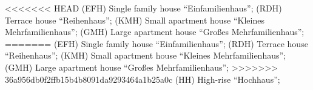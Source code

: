 <<<<<<< HEAD
(EFH) Single family house ``Einfamilienhaus'';
(RDH) Terrace house ``Reihenhaus'';
(KMH) Small apartment house ``Kleines Mehrfamilienhaus'';
(GMH) Large apartment house ``Großes Mehrfamilienhaus'';
=======
(EFH) Single family house ``Einfamilienhaus'';
(RDH) Terrace house ``Reihenhaus'';
(KMH) Small apartment house ``Kleines Mehrfamilienhaus'';
(GMH) Large apartment house ``Großes Mehrfamilienhaus'';
>>>>>>> 36a956db0f2ffb15b4b8091da9293464a1b25a0c
(HH) High-rise ``Hochhaus'';
